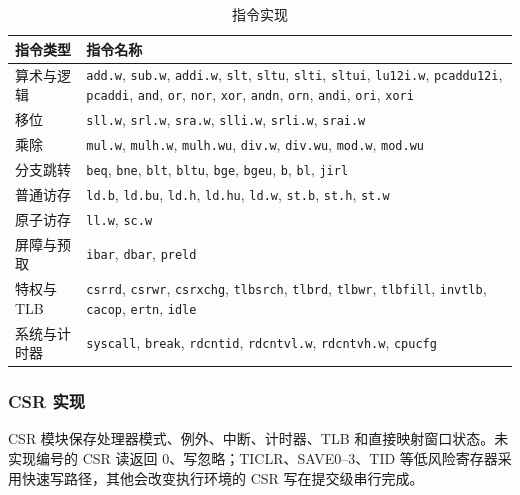 \begin{table}[H]
\centering
\caption{指令实现}
\label{tab:inst}
\scriptsize
\begin{tabularx}{\textwidth}{>{\raggedright\arraybackslash}p{2.7cm}X}
\toprule
指令类型 & 指令名称 \\
\midrule
算术与逻辑 & \texttt{add.w}, \texttt{sub.w}, \texttt{addi.w}, \texttt{slt}, \texttt{sltu}, \texttt{slti}, \texttt{sltui}, \texttt{lu12i.w}, \texttt{pcaddu12i}, \texttt{pcaddi}, \texttt{and}, \texttt{or}, \texttt{nor}, \texttt{xor}, \texttt{andn}, \texttt{orn}, \texttt{andi}, \texttt{ori}, \texttt{xori} \\
移位 & \texttt{sll.w}, \texttt{srl.w}, \texttt{sra.w}, \texttt{slli.w}, \texttt{srli.w}, \texttt{srai.w} \\
乘除 & \texttt{mul.w}, \texttt{mulh.w}, \texttt{mulh.wu}, \texttt{div.w}, \texttt{div.wu}, \texttt{mod.w}, \texttt{mod.wu} \\
分支跳转 & \texttt{beq}, \texttt{bne}, \texttt{blt}, \texttt{bltu}, \texttt{bge}, \texttt{bgeu}, \texttt{b}, \texttt{bl}, \texttt{jirl} \\
普通访存 & \texttt{ld.b}, \texttt{ld.bu}, \texttt{ld.h}, \texttt{ld.hu}, \texttt{ld.w}, \texttt{st.b}, \texttt{st.h}, \texttt{st.w} \\
原子访存 & \texttt{ll.w}, \texttt{sc.w} \\
屏障与预取 & \texttt{ibar}, \texttt{dbar}, \texttt{preld} \\
特权与 TLB & \texttt{csrrd}, \texttt{csrwr}, \texttt{csrxchg}, \texttt{tlbsrch}, \texttt{tlbrd}, \texttt{tlbwr}, \texttt{tlbfill}, \texttt{invtlb}, \texttt{cacop}, \texttt{ertn}, \texttt{idle} \\
系统与计时器 & \texttt{syscall}, \texttt{break}, \texttt{rdcntid}, \texttt{rdcntvl.w}, \texttt{rdcntvh.w}, \texttt{cpucfg} \\
\bottomrule
\end{tabularx}
\end{table}

\subsubsection{CSR 实现}

CSR 模块保存处理器模式、例外、中断、计时器、TLB 和直接映射窗口状态。未实现编号的 CSR 读返回 0、写忽略；TICLR、SAVE0--3、TID 等低风险寄存器采用快速写路径，其他会改变执行环境的 CSR 写在提交级串行完成。

